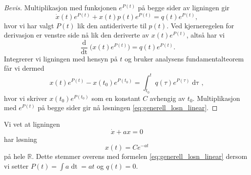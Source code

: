 \documentclass{article}
\theoremstyle{plain}
\theoremstyle{definition}
\theoremstyle{remark}
\newenvironment{ex}
{\pushQED{\qed}\renewcommand{\qedsymbol}{$\triangle$}\exx}
{\popQED\endexx}
\newcommand{\diff}[1]{\mathop{d#1}}
\newcommand{\fcn}{x}
\newcommand{\expfcn}[1]{e^{#1}}
\newcommand{\bigparanth}[1]{\big(#1\big)}
\begin{document}
\begin{proof}[Bevis]
    Multiplikasjon med funksjonen $\expfcn{P(t)}$ på begge sider av ligningen gir
    \begin{equation*}
        \dot{\fcn}(t) \expfcn{P(t)} + \fcn(t) p(t) \expfcn{P(t)} = q(t) \expfcn{P(t)},
    \end{equation*}
    hvor vi har valgt $P(t)$ lik den antideriverte til $p(t)$. Ved kjerneregelen for derivasjon er venstre side nå lik den deriverte av $\fcn(t) \expfcn{P(t)}$, altså har vi
    \begin{equation*}
        \frac{\diff{}}{\diff{t}} \bigparanth{\fcn(t) \expfcn{P(t)}} = q(t) \expfcn{P(t)}.
    \end{equation*}
    Integrerer vi ligningen med hensyn på $t$ og bruker analysens fundamentalteorem får vi dermed
    \begin{equation*}
        \fcn(t) \expfcn{P(t)} - \fcn(t_0) \expfcn{P(t_0)} = \int_{t_0}^t q(\tau) \expfcn{P(\tau)} \diff{\tau},
    \end{equation*}
    hvor vi skriver $\fcn(t_0) \expfcn{P(t_0)}$ som en konstant $C$ avhengig av $t_0$. Multiplikasjon med $\expfcn{P(t)}$ på begge sider gir nå løsningen \eqref{eq:generell_losn_linear}.
\end{proof}

\begin{ex}
    Vi vet at ligningen
    \begin{equation*}
        \dot{\fcn} + a \fcn = 0
    \end{equation*}
    har løsning
    \begin{equation*}
        \fcn(t) = C \expfcn{-a t}
    \end{equation*}
    på hele $\mathbb{R}$. Dette stemmer overens med formelen \eqref{eq:generell_losn_linear} dersom vi setter $P(t) = \int a \diff{t} = at$ og $q(t) = 0$.
\end{ex}
\end{document}
